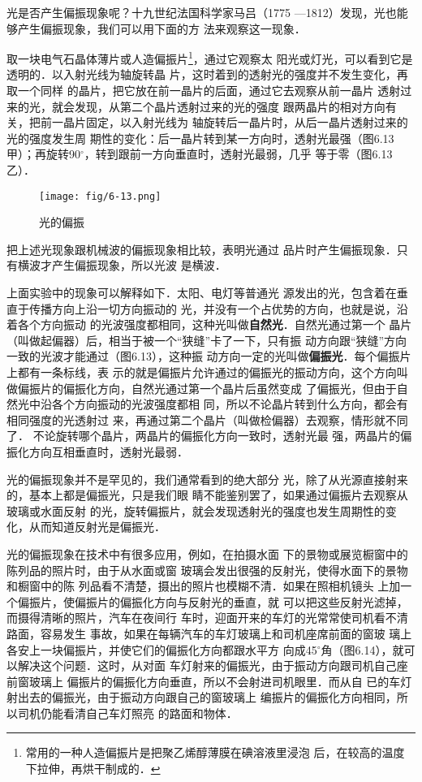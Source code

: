 光是否产生偏振现象呢？十九世纪法国科学家马吕（1775
—1812）发现，光也能够产生偏振现象，我们可以用下面的方
法来观察这一现象．

取一块电气石晶体薄片或人造偏振片\footnote{常用的一种人造偏振片是把聚乙烯醇薄膜在碘溶液里浸泡
后，在较高的温度下拉伸，再烘干制成的．}，通过它观察太
阳光或灯光，可以看到它是透明的．以入射光线为轴旋转晶
片，这时着到的透射光的强度并不发生变化，再取一个同样
的晶片，把它放在前一晶片的后面，通过它去观察从前一晶片
透射过来的光，就会发现，从第二个晶片透射过来的光的强度
跟两晶片的相对方向有关，把前一晶片固定，以入射光线为
轴旋转后一晶片时，从后一晶片透射过来的光的强度发生周
期性的变化：后一晶片转到某一方向时，透射光最强（图6.13
甲）；再旋转90$^\circ$，转到跟前一方向垂直时，透射光最弱，几乎
等于零（图6.13乙）．
\begin{figure}[htp]\centering
    \texttt{[image: fig/6-13.png]}
    \caption{光的偏振}
    \end{figure}

把上述光现象跟机械波的偏振现象相比较，表明光通过
品片时产生偏振现象．只有横波才产生偏振现象，所以光波
是横波．

上面实验中的现象可以解释如下．太阳、电灯等普通光
源发出的光，包含着在垂直于传播方向上沿一切方向振动的
光，并没有一个占优势的方向，也就是说，沿着各个方向振动
的光波强度都相同，这种光叫做\textbf{自然光}．自然光通过第一个
晶片（叫做起偏器）后，相当于被一个“狭缝”卡了一下，只有振
动方向跟“狭缝”方向一致的光波才能通过（图6.13），这种振
动方向一定的光叫做\textbf{偏振光}．每个偏振片上都有一条标线，表
示的就是偏振片允许通过的偏振光的振动方向，这个方向叫
做偏振片的偏振化方向，自然光通过第一个晶片后虽然变成
了偏振光，但由于自然光中沿各个方向振动的光波强度都相
同，所以不论晶片转到什么方向，都会有相同强度的光透射过
来，再通过第二个晶片（叫做检偏器）去观察，情形就不同了．
不论旋转哪个晶片，两晶片的偏振化方向一致时，透射光最
强，两晶片的偏振化方向互相垂直时，透射光最弱．

光的偏振现象并不是罕见的，我们通常看到的绝大部分
光，除了从光源直接射来的，基本上都是偏振光，只是我们眼
睛不能鉴别罢了，如果通过偏振片去观察从玻璃或水面反射
的光，旋转偏振片，就会发现透射光的强度也发生周期性的变
化，从而知道反射光是偏振光．

光的偏振现象在技术中有很多应用，例如，在拍摄水面
下的景物或展览橱窗中的陈列品的照片时，由于从水面或窗
玻璃会发出很强的反射光，使得水面下的景物和橱窗中的陈
列品看不清楚，摄出的照片也模糊不清．如果在照相机镜头
上加一个偏振片，使偏振片的偏振化方向与反射光的垂直，就
可以把这些反射光滤掉，而摄得清晰的照片，汽车在夜间行
车时，迎面开来的车灯的光常常使司机看不清路面，容易发生
事故，如果在每辆汽车的车灯玻璃上和司机座席前面的窗玻
璃上各安上一块偏振片，并使它们的偏振化方向都跟水平方
向成45$^\circ$角（图6.14），就可以解决这个问题．这时，从对面
车灯射来的偏振光，由于振动方向跟司机自己座前窗玻璃上
偏振片的偏振化方向垂直，所以不会射进司机眼里．而从自
已的车灯射出去的偏振光，由于振动方向跟自己的窗玻璃上
编振片的偏振化方向相同，所以司机仍能看清自己车灯照亮
的路面和物体．

